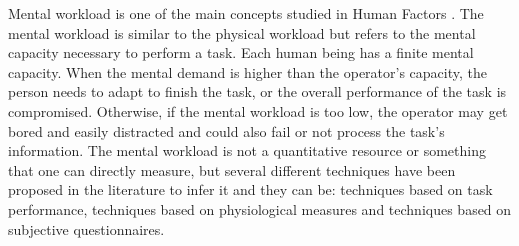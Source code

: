 Mental workload is one of the main concepts studied in Human Factors \cite{stanton2004handbook}. The mental workload is similar to the physical workload but refers to the mental capacity necessary to perform a task. Each human being has a finite mental capacity. When the mental demand is higher than the operator's capacity, the person needs to adapt to finish the task, or the overall performance of the task is compromised. Otherwise, if the mental workload is too low, the operator may get bored and easily distracted and could also fail or not process the task's information. The mental workload is not a quantitative resource or something that one can directly measure, but several different techniques have been proposed in the literature to infer it and they can be: techniques based on task performance, techniques based on physiological measures and techniques based on subjective questionnaires.
        
%    


